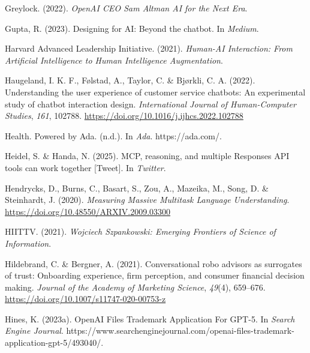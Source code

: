 \documentclass[
  letterpaper,
  DIV=11,
  numbers=noendperiod]{scrartcl}
\newlength{\cslhangindent}
\newenvironment{CSLReferences}[2] %
 {\begin{list}{}{%
  \setlength{\itemindent}{0pt}
  \setlength{\leftmargin}{0pt}
  \setlength{\parsep}{0pt}
  \ifodd #1
   \setlength{\leftmargin}{\cslhangindent}
   \setlength{\itemindent}{-1\cslhangindent}
  \fi
  \setlength{\itemsep}{#2\baselineskip}}}
 {\end{list}}
\begin{document}
\begin{CSLReferences}{1}{0}
Greylock. (2022). \emph{{OpenAI CEO Sam Altman} {\textbar} {AI} for the
{Next Era}}.

Gupta, R. (2023). Designing for {AI}: Beyond the chatbot. In
\emph{Medium}.

Harvard Advanced Leadership Initiative. (2021). \emph{Human-{AI
Interaction}: {From Artificial Intelligence} to {Human Intelligence
Augmentation}}.

Haugeland, I. K. F., Følstad, A., Taylor, C. \& Bjørkli, C. A. (2022).
Understanding the user experience of customer service chatbots: {An}
experimental study of chatbot interaction design. \emph{International
Journal of Human-Computer Studies}, \emph{161}, 102788.
\url{https://doi.org/10.1016/j.ijhcs.2022.102788}

Health. {Powered} by {Ada}. (n.d.). In \emph{Ada}. https://ada.com/.

Heidel, S. \& Handa, N. (2025). {MCP}, reasoning, and multiple
{Responses API} tools can work together {[}Tweet{]}. In \emph{Twitter}.

Hendrycks, D., Burns, C., Basart, S., Zou, A., Mazeika, M., Song, D. \&
Steinhardt, J. (2020). \emph{Measuring {Massive Multitask Language
Understanding}}. \url{https://doi.org/10.48550/ARXIV.2009.03300}

HIITTV. (2021). \emph{Wojciech {Szpankowski}: {Emerging Frontiers} of
{Science} of {Information}}.

Hildebrand, C. \& Bergner, A. (2021). Conversational robo advisors as
surrogates of trust: Onboarding experience, firm perception, and
consumer financial decision making. \emph{Journal of the Academy of
Marketing Science}, \emph{49}(4), 659--676.
\url{https://doi.org/10.1007/s11747-020-00753-z}

Hines, K. (2023a). {OpenAI Files Trademark Application For GPT-5}. In
\emph{Search Engine Journal}.
https://www.searchenginejournal.com/openai-files-trademark-application-gpt-5/493040/.


\end{CSLReferences}
\end{document}
